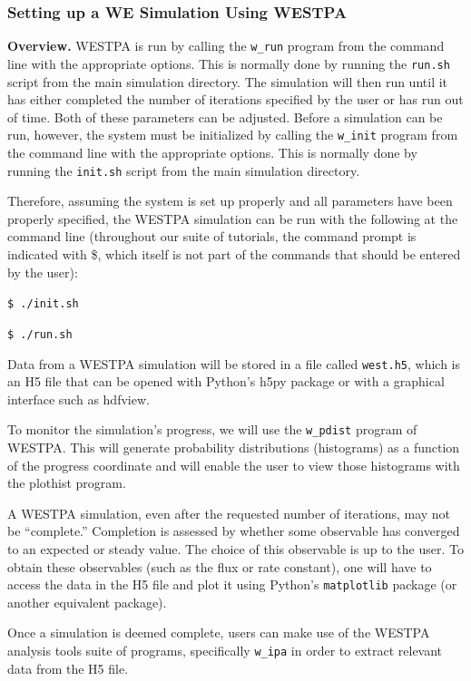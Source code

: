 \documentclass[9pt,tutorial]{livecoms}
\begin{document}
\subsubsection{Setting up a WE Simulation Using WESTPA}

\textbf{Overview.} WESTPA is run by calling the \verb|w_run| program from the command line with the appropriate options. 
This is normally done by running the \verb|run.sh| script from the main simulation directory. 
The simulation will then run until it has either completed the number of iterations specified by the user or has run out of time. 
Both of these parameters can be adjusted. 
Before a simulation can be run, however, the system must be initialized by calling the \verb|w_init| program from the command line with the appropriate options. 
This is normally done by running the \verb|init.sh| script from the main simulation directory.

Therefore, assuming the system is set up properly and all parameters have been properly specified, the WESTPA simulation can be run with the following at the command line (throughout our suite of tutorials, the command prompt is indicated with \$, which itself is not part of the commands that should be entered by the user):
 
\verb|$ ./init.sh|

\verb|$ ./run.sh|
 
Data from a WESTPA simulation will be stored in a file called \verb|west.h5|, which is an H5 file that can be opened with Python’s h5py package or with a graphical interface such as hdfview.

To monitor the simulation’s progress, we will use  the \verb|w_pdist| program of WESTPA. 
This will generate probability distributions (histograms) as a function of the progress coordinate and will enable the user to view those histograms with the plothist program. 

A WESTPA simulation, even after the requested number of iterations, may not be “complete.”  
Completion is assessed by whether some observable has converged to an expected or steady value. 
The choice of this observable is up to the user. 
To obtain these observables (such as the flux or rate constant), one will have to access the data in the H5 file and plot it using Python’s \verb|matplotlib| package (or another equivalent package).

Once a simulation is deemed complete, users can make use of the WESTPA analysis tools suite of programs, specifically \verb|w_ipa| in order to extract relevant data from the H5 file.
\end{document}
